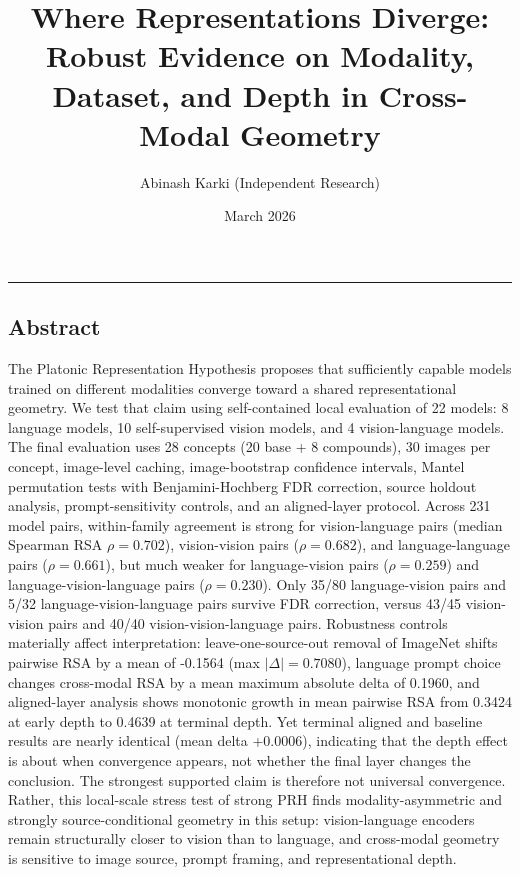 \documentclass[
]{article}
\title{Where Representations Diverge: Robust Evidence on Modality,
Dataset, and Depth in Cross-Modal Geometry}
\author{Abinash Karki (Independent Research)}
\date{March 2026}
\begin{document}
\maketitle

\begin{center}\rule{0.5\linewidth}{0.5pt}\end{center}

\subsection{Abstract}\label{abstract}

The Platonic Representation Hypothesis proposes that sufficiently
capable models trained on different modalities converge toward a shared
representational geometry. We test that claim using self-contained local
evaluation of 22 models: 8 language models, 10 self-supervised vision
models, and 4 vision-language models. The final evaluation uses 28
concepts (20 base + 8 compounds), 30 images per concept, image-level
caching, image-bootstrap confidence intervals, Mantel permutation tests
with Benjamini-Hochberg FDR correction, source holdout analysis,
prompt-sensitivity controls, and an aligned-layer protocol. Across 231
model pairs, within-family agreement is strong for vision-language pairs
(median Spearman RSA \(\rho = 0.702\)), vision-vision pairs
(\(\rho = 0.682\)), and language-language pairs (\(\rho = 0.661\)), but
much weaker for language-vision pairs (\(\rho = 0.259\)) and
language-vision-language pairs (\(\rho = 0.230\)). Only 35/80
language-vision pairs and 5/32 language-vision-language pairs survive
FDR correction, versus 43/45 vision-vision pairs and 40/40
vision-vision-language pairs. Robustness controls materially affect
interpretation: leave-one-source-out removal of ImageNet shifts pairwise
RSA by a mean of -0.1564 (max \(|\Delta| = 0.7080\)), language prompt
choice changes cross-modal RSA by a mean maximum absolute delta of
0.1960, and aligned-layer analysis shows monotonic growth in mean
pairwise RSA from 0.3424 at early depth to 0.4639 at terminal depth. Yet
terminal aligned and baseline results are nearly identical (mean delta
+0.0006), indicating that the depth effect is about when convergence
appears, not whether the final layer changes the conclusion. The
strongest supported claim is therefore not universal convergence.
Rather, this local-scale stress test of strong PRH finds
modality-asymmetric and strongly source-conditional geometry in this
setup: vision-language encoders remain structurally closer to vision
than to language, and cross-modal geometry is sensitive to image
source, prompt framing, and representational depth.
\end{document}

